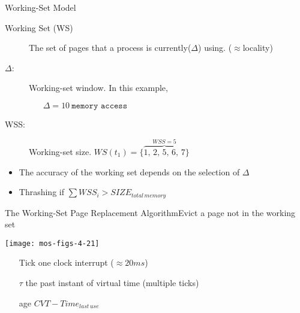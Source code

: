 \begin{frame}{Working-Set Model}
  \begin{description}
  \item[Working Set (WS)] The set of pages that a process is currently($\Delta$)
    using. (\(\approx{}\)locality)
  \end{description}
  \begin{center}
  \end{center}
  \begin{iblock}{}
    \begin{description}
    \item[$\Delta$:] Working-set window. In this example,
      \begin{itemize}
      \item[] $\Delta=10\ \texttt{memory access}$
      \end{itemize}
    \item[WSS:] Working-set size.  $WS(t_1)=\{\overbrace{1,\,2,\,5,\,6,\,7}^{WSS=5}\}$
    \end{description}
  \end{iblock}
  \begin{itemize}
  \item The accuracy of the working set depends on the selection of $\Delta$
  \item Thrashing if \(\sum{}WSS_i > SIZE_{total\,memory}\)
  \end{itemize}
\end{frame}

\begin{frame}{The Working-Set Page Replacement Algorithm}{Evict a page not in the working set}
  \begin{minipage}{.7\linewidth}
    \texttt{[image: mos-figs-4-21]}
  \end{minipage}
  \begin{minipage}{.28\linewidth}\scriptsize
    \begin{itemize}
    \item[Tick] one clock interrupt (\(\approx{} 20ms\))
    \item[\(\mathit{\tau}\)] the past instant of virtual time (multiple ticks)
    \item[age] \(CVT - Time_{last\, use}\)
    \end{itemize}
  \end{minipage}
\end{frame}

